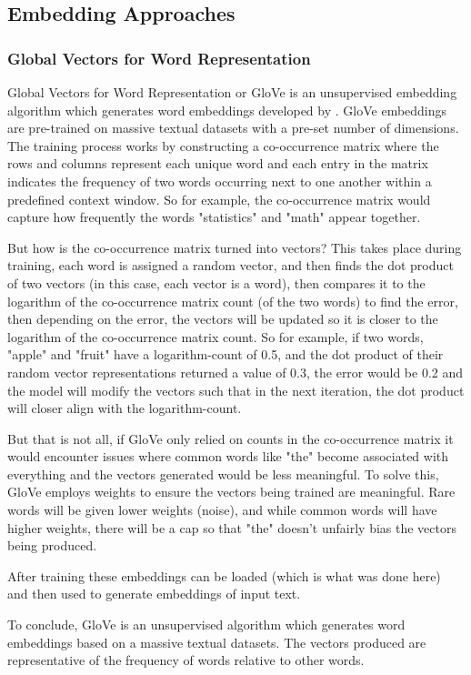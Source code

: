 \documentclass[stu,12pt,floatsintext,donotrepeattitle]{apa7}
\begin{document}
\subsection{Embedding Approaches}
\subsubsection{Global Vectors for Word Representation}
Global Vectors for Word Representation or GloVe is an unsupervised embedding algorithm which generates word embeddings developed by \textcite{glove}. GloVe embeddings are pre-trained on massive textual datasets with a pre-set number of dimensions. The training process works by constructing a co-occurrence matrix where the rows and columns represent each unique word and each entry in the matrix indicates the frequency of two words occurring next to one another within a predefined context window. So for example, the co-occurrence matrix would capture how frequently the words "statistics" and "math" appear together. 

But how is the co-occurrence matrix turned into vectors? This takes place during training, each word is assigned a random vector, and then finds the dot product of two vectors (in this case, each vector is a word), then compares it to the logarithm of the co-occurrence matrix count (of the two words) to find the error, then depending on the error, the vectors will be updated so it is closer to the logarithm of the co-occurrence matrix count. So for example, if two words, "apple" and "fruit" have a logarithm-count of 0.5, and the dot product of their random vector representations returned a value of 0.3, the error would be 0.2 and the model will modify the vectors such that in the next iteration, the dot product will closer align with the logarithm-count. 

But that is not all, if GloVe only relied on counts in the co-occurrence matrix it would encounter issues where common words like "the" become associated with everything and the vectors generated would be less meaningful. To solve this, GloVe employs weights to ensure the vectors being trained are meaningful. Rare words will be given lower weights (noise), and while common words will have higher weights, there will be a cap so that "the" doesn't unfairly bias the vectors being produced. 

After training these embeddings can be loaded (which is what was done here) and then used to generate embeddings of input text. 

To conclude, GloVe is an unsupervised algorithm which generates word embeddings based on a massive textual datasets. The vectors produced are representative of the frequency of words relative to other words. 
\end{document}
